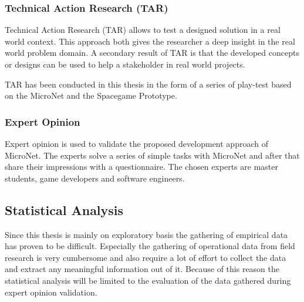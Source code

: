 \subsubsection{Technical Action Research (TAR)}

Technical Action Research (TAR) allows to test a designed solution in a real
world context. This approach both gives the researcher a deep insight in the real
world problem domain. A secondary result of TAR is that the developed concepts
or designs can be used to help a stakeholder in real world projects.

TAR has been conducted in this thesis in the form of a series of play-test based
on the MicroNet and the Spacegame Prototype.

\subsubsection{Expert Opinion}

Expert opinion is used to validate the proposed development approach of
MicroNet. The experts solve a series of simple tasks with MicroNet and after
that share their impressions with a questionnaire. The chosen experts are master
students, game developers and software engineers.

\subsection{Statistical Analysis}

Since this thesis is mainly on exploratory basis the gathering of empirical data
has proven to be difficult. Especially the gathering of operational data from
field research is very cumbersome and also require a lot of effort to collect
the data and extract any meaningful information out of it. Because of this
reason the statistical analysis will be limited to the evaluation of the data
gathered during expert opinion validation.






